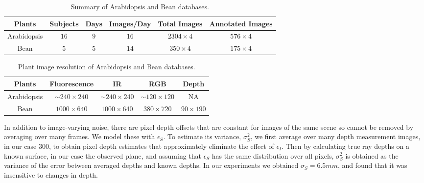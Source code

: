 \begin{table*}[t!]
\begin{center}
\caption{Summary of Arabidopsis and Bean databases.}
\label{tab:stat}
\begin{tabular}{c|c|c|c|c|c}
      \hline
      Plants     & Subjects & Days & Images/Day & Total Images & Annotated Images \\
      \hline
      Arabidopsis &  $16$      &  $9$   &     $16$     &     $2304\times 4$     &       $576\times 4$     \\
      \hline
      Bean        &   $5$      &  $5$   &     $14$     &     $350\times 4$       &       $175\times 4$  \\
      \hline
\end{tabular}
\end{center}
\end{table*}



\begin{table*}
\begin{center}
\caption{Plant image resolution of Arabidopsis and Bean databases.}
\label{tab:resolution}
\begin{tabular}{c|c|c|c|c}
      \hline
      Plants     & Fluorescence       & IR        & RGB      & Depth     \\
      \hline
      Arabidopsis &  $\sim$$240\times240$ &  $\sim$$240\times240$  & $\sim$$120\times120$  & NA  \\
      Bean        & $1000\times640$ & $1000\times640$ & $380\times720$ & $90\times190$    \\
      \hline
\end{tabular}
\end{center}
\end{table*}

In addition to image-varying noise, there are pixel depth offsets that are constant for images of the same scene so cannot be removed by averaging over many frames.  We model these with $\epsilon_S$.  To estimate its variance, $\sigma_S^2$, we first average over many depth measurement images, in our case 300, to obtain pixel depth estimates that approximately eliminate the effect of $\epsilon_I$.  Then by calculating true ray depths on a known surface, in our case the observed plane, and assuming that $\epsilon_S$ has the same distribution over all pixels, $\sigma_S^2$ is obtained as the variance of the error between averaged depths and known depths.  In our experiments we obtained $\sigma_S=6.5mm$, and found that it was insensitive to changes in depth.



